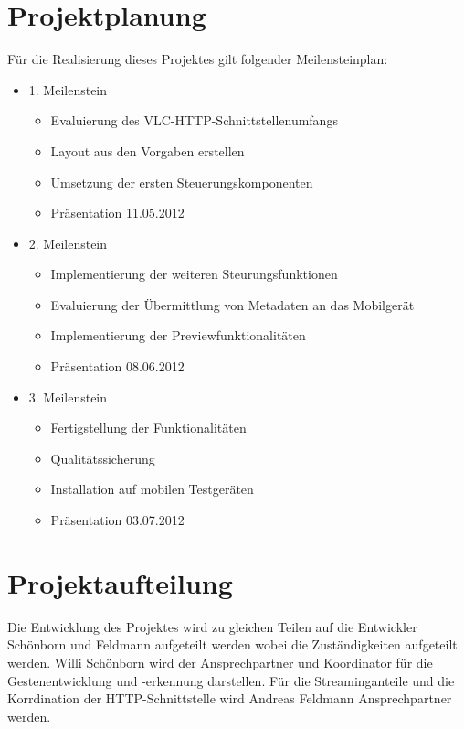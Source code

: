 \documentclass[a4paper]{article}
\begin{document}
\section*{Projektplanung}
Für die Realisierung dieses Projektes gilt folgender Meilensteinplan:
\begin{itemize}
\item 1. Meilenstein
\begin{itemize}
\item Evaluierung des VLC-HTTP-Schnittstellenumfangs
\item Layout aus den Vorgaben erstellen
\item Umsetzung der ersten Steuerungskomponenten
\item Präsentation 11.05.2012
\end{itemize}
\item 2. Meilenstein
\begin{itemize}
\item Implementierung der weiteren Steurungsfunktionen
\item Evaluierung der Übermittlung von Metadaten an das Mobilgerät
\item Implementierung der Previewfunktionalitäten
\item Präsentation 08.06.2012
\end{itemize}
\item 3. Meilenstein
\begin{itemize}
\item Fertigstellung der Funktionalitäten
\item Qualitätssicherung
\item Installation auf mobilen Testgeräten
\item Präsentation 03.07.2012
\end{itemize}
\end{itemize}

\section*{Projektaufteilung}
Die Entwicklung des Projektes wird zu gleichen Teilen auf die Entwickler Schönborn und Feldmann aufgeteilt werden wobei die Zuständigkeiten aufgeteilt werden. Willi Schönborn wird der Ansprechpartner und Koordinator für die Gestenentwicklung und -erkennung darstellen. Für die Streaminganteile und die Korrdination der HTTP-Schnittstelle wird Andreas Feldmann Ansprechpartner werden. 

\newpage
\printbibliography
\end{document}
